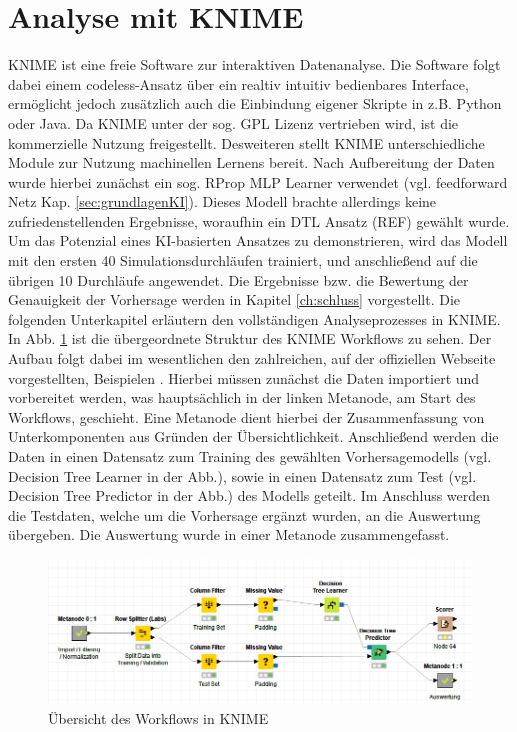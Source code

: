     \section{Analyse mit KNIME}
    \label{sec:knime}
    \ac{KNIME} ist eine freie Software zur interaktiven Datenanalyse. Die Software folgt dabei einem codeless-Ansatz über ein realtiv intuitiv bedienbares Interface, ermöglicht jedoch zusätzlich auch die Einbindung eigener Skripte in z.B. Python oder Java. Da KNIME unter der sog. GPL Lizenz vertrieben wird, ist die kommerzielle Nutzung freigestellt.
    Desweiteren stellt KNIME unterschiedliche Module zur Nutzung machinellen Lernens bereit. Nach Aufbereitung der Daten wurde hierbei zunächst ein sog. RProp MLP Learner verwendet (vgl. feedforward Netz Kap. \ref{sec:grundlagenKI}). Dieses Modell brachte allerdings keine zufriedenstellenden Ergebnisse, woraufhin ein \ac{DTL} Ansatz (REF) gewählt wurde. Um das Potenzial eines KI-basierten Ansatzes zu demonstrieren, wird das Modell mit den ersten 40 Simulationsdurchläufen trainiert, und anschließend auf die übrigen 10 Durchläufe angewendet. Die Ergebnisse bzw. die Bewertung der Genauigkeit der Vorhersage werden in Kapitel \ref{ch:schluss} vorgestellt. Die folgenden Unterkapitel erläutern den vollständigen Analyseprozesses in KNIME. \newline
    In Abb. \ref{fi:knime_all} ist die übergeordnete Struktur des KNIME Workflows zu sehen. Der Aufbau folgt dabei im wesentlichen den zahlreichen, auf der offiziellen Webseite vorgestellten, Beispielen \cite{knimehub}. Hierbei müssen zunächst die Daten importiert und vorbereitet werden, was hauptsächlich in der linken Metanode, am Start des Workflows, geschieht. Eine Metanode dient hierbei der Zusammenfassung von Unterkomponenten aus Gründen der Übersichtlichkeit. Anschließend werden die Daten in einen Datensatz zum Training des gewählten Vorhersagemodells (vgl. Decision Tree Learner in der Abb.), sowie in einen Datensatz zum Test (vgl. Decision Tree Predictor in der Abb.) des Modells geteilt. Im Anschluss werden die Testdaten, welche um die Vorhersage ergänzt wurden, an die Auswertung übergeben. Die Auswertung wurde in einer Metanode zusammengefasst.
    \begin{figure}[H]
        \begin{center}
            \includegraphics[width=\linewidth]{images/knime_all.png}
            \caption[KNIME Übersicht]{Übersicht des Workflows in KNIME}
            \label{fi:knime_all}
        \end{center}
    \end{figure}
